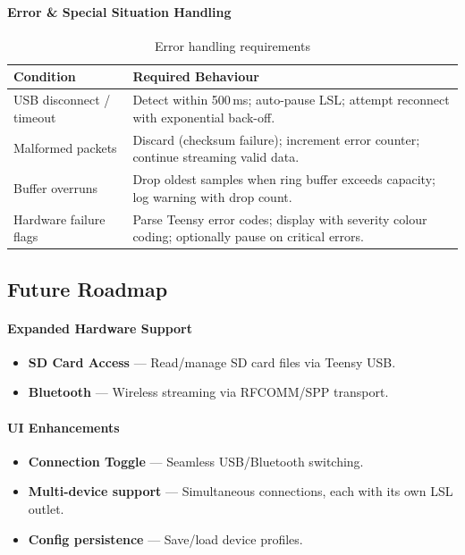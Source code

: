 \documentclass[11pt,a4paper]{article}
\begin{document}
\paragraph{Error \& Special Situation Handling}

\begin{table}[H]
\centering
\caption{Error handling requirements}
\label{tab:error-handling}
\begin{tabularx}{\textwidth}{l X}
\toprule
\textbf{Condition} & \textbf{Required Behaviour} \\
\midrule
USB disconnect / timeout
    & Detect within 500\,ms; auto-pause LSL; attempt reconnect
      with exponential back-off. \\
Malformed packets
    & Discard (checksum failure); increment error counter; continue
      streaming valid data. \\
Buffer overruns
    & Drop oldest samples when ring buffer exceeds capacity; log
      warning with drop count. \\
Hardware failure flags
    & Parse Teensy error codes; display with severity colour coding;
      optionally pause on critical errors. \\
\bottomrule
\end{tabularx}
\end{table}

\subsection{Future Roadmap}

\paragraph{Expanded Hardware Support}

\begin{itemize}
    \item \textbf{SD Card Access} — Read/manage SD card files via Teensy USB.
    \item \textbf{Bluetooth} — Wireless streaming via RFCOMM/SPP transport.
\end{itemize}

\paragraph{UI Enhancements}

\begin{itemize}
    \item \textbf{Connection Toggle} — Seamless USB/Bluetooth switching.
    \item \textbf{Multi-device support} — Simultaneous connections, each
          with its own LSL outlet.
    \item \textbf{Config persistence} — Save/load device profiles.
\end{itemize}
\end{document}
